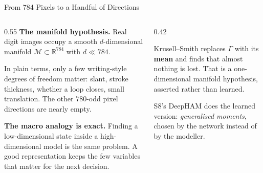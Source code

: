 \begin{frame}{From 784 Pixels to a Handful of Directions}
\begin{columns}[T]
\begin{column}{0.55\textwidth}
\small
\textbf{The manifold hypothesis.} Real digit images occupy a smooth $d$-dimensional manifold $\mathcal{M}\subset\mathbb{R}^{784}$ with $d\ll784$.
\medskip

In plain terms, only a few writing-style degrees of freedom matter: slant, stroke thickness, whether a loop closes, small translation. The other $780$-odd pixel directions are nearly empty.
\medskip

\textbf{The macro analogy is exact.} Finding a low-dimensional state inside a high-dimensional model is the same problem. A good representation keeps the few variables that matter for the next decision.
\end{column}
\begin{column}{0.42\textwidth}
\begin{conceptbox}[title=\textbf{You have done this before}]\small
Krusell--Smith replaces $\Gamma$ with its \textbf{mean} and finds that almost nothing is lost. That is a one-dimensional manifold hypothesis, asserted rather than learned.
\end{conceptbox}
\medskip
\begin{examplebox}\footnotesize
S8's DeepHAM does the learned version: \emph{generalised moments}, chosen by the network instead of by the modeller.
\end{examplebox}
\end{column}
\end{columns}
\end{frame}

